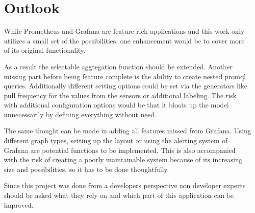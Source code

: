 \section{Outlook}

While Prometheus and Grafana are feature rich applications and this work only utilizes a small set of the possibilities, one enhancement would be to cover more of its original functionality.

As a result the selectable aggregation function should be extended. Another missing part before being feature complete is the ability to create nested \gls{promql} queries. Additionally different setting options could be set via the generators like pull frequency for the values from the sensors or additional labeling. The risk with additional configuration options would be that it bloats up the model unnecessarily by defining everything without need.

The same thought can be made in adding all features missed from Grafana. Using different graph types, setting up the layout or using the alerting system of Grafana are potential functions to be implemented. This is also accompanied with the risk of creating a poorly maintainable system because of its increasing size and possibilities, so it has to be done thoughtfully.

Since this project was done from a developers perspective non developer experts should be asked what they rely on and which part of this application can be improved.


